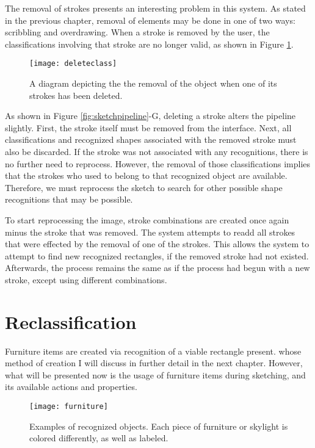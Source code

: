 The removal of strokes presents an interesting problem in this system. As stated in the previous chapter, removal of elements may be done in one of two ways: scribbling and overdrawing. When a stroke is removed by the user, the classifications involving that stroke are no longer valid, as shown in Figure \ref{fig:deleteclass}.

\begin{figure}[ht]
\centering
\texttt{[image: deleteclass]}
\caption[Removal of objects when a stroke is removed]{A diagram depicting the the removal of the object when one of its strokes has been deleted.}
\label{fig:deleteclass}
\end{figure}

As shown in Figure \ref{fig:sketchpipeline}-G, deleting a stroke alters the pipeline slightly. First, the stroke itself must be removed from the interface. Next, all classifications and recognized shapes associated with the removed stroke must also be discarded. If the stroke was not associated with any recognitions, there is no further need to reprocess. However, the removal of those classifications implies that the strokes who used to belong to that recognized object are available. Therefore, we must reprocess the sketch to search for other possible shape recognitions that may be possible.

To start reprocessing the image, stroke combinations are created once again minus the stroke that was removed. The system attempts to readd all strokes that were effected by the removal of one of the strokes. This allows the system to attempt to find new recognized rectangles, if the removed stroke had not existed. Afterwards, the process remains the same as if the process had begun with a new stroke, except using different combinations.

\section{Reclassification}
Furniture items are created via recognition of a viable rectangle present. whose method of creation I will discuss in further detail in the next chapter. However, what will be presented now is the usage of furniture items during sketching, and its available actions and properties.

\begin{figure}[ht]
\centering
\texttt{[image: furniture]}
\caption[Examples of recognized objects]{Examples of recognized objects. Each piece of furniture or skylight is colored differently, as well as labeled.}
\label{fig:furniture}
\end{figure}


